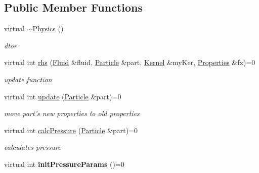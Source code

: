 \subsection*{\-Public \-Member \-Functions}
\begin{DoxyCompactItemize}
\item 
\hypertarget{classPhysics_afdd87b5bb9fe2e927c37d50fbeb8216b}{virtual \hyperlink{classPhysics_afdd87b5bb9fe2e927c37d50fbeb8216b}{$\sim$\-Physics} ()}\label{classPhysics_afdd87b5bb9fe2e927c37d50fbeb8216b}

\begin{DoxyCompactList}\small\item\em dtor \end{DoxyCompactList}\item 
virtual int \hyperlink{classPhysics_a0fd5afe65228da08e3886e58d5285d43}{rhs} (\hyperlink{classFluid}{\-Fluid} \&fluid, \hyperlink{classParticle}{\-Particle} \&part, \hyperlink{classKernel}{\-Kernel} \&my\-Ker, \hyperlink{structProperties}{\-Properties} \&fx)=0
\begin{DoxyCompactList}\small\item\em update function \end{DoxyCompactList}\item 
\hypertarget{classPhysics_ab51a11d51e09b132610cd6fbb95d0c0c}{virtual int \hyperlink{classPhysics_ab51a11d51e09b132610cd6fbb95d0c0c}{update} (\hyperlink{classParticle}{\-Particle} \&part)=0}\label{classPhysics_ab51a11d51e09b132610cd6fbb95d0c0c}

\begin{DoxyCompactList}\small\item\em move part's new properties to old properties \end{DoxyCompactList}\item 
\hypertarget{classPhysics_a50759e0407dff12021c94f9fa6729765}{virtual int \hyperlink{classPhysics_a50759e0407dff12021c94f9fa6729765}{calc\-Pressure} (\hyperlink{classParticle}{\-Particle} \&part)=0}\label{classPhysics_a50759e0407dff12021c94f9fa6729765}

\begin{DoxyCompactList}\small\item\em calculates pressure \end{DoxyCompactList}\item 
\hypertarget{classPhysics_a933c3288d21bd8dbdab422d4fe09f84d}{virtual int {\bfseries init\-Pressure\-Params} ()=0}\label{classPhysics_a933c3288d21bd8dbdab422d4fe09f84d}

\end{DoxyCompactItemize}


